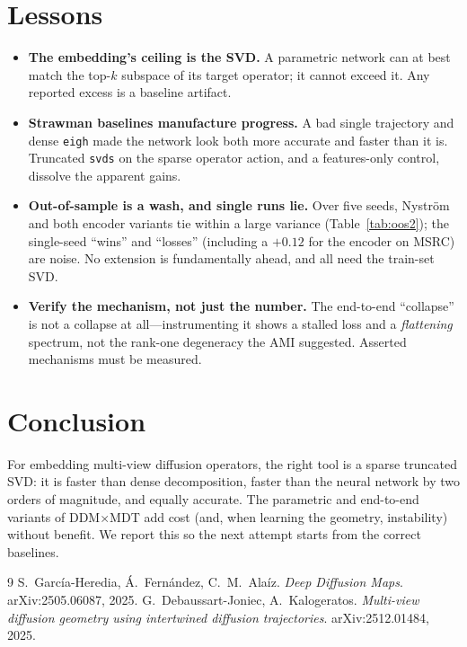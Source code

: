 \documentclass[10pt,twocolumn]{article}
\begin{document}
\section{Lessons}
\begin{itemize}\itemsep2pt
\item \textbf{The embedding's ceiling is the SVD.} A parametric network can at best match the top-$k$
subspace of its target operator; it cannot exceed it. Any reported excess is a baseline artifact.
\item \textbf{Strawman baselines manufacture progress.} A bad single trajectory and dense
\texttt{eigh} made the network look both more accurate and faster than it is. Truncated \texttt{svds}
on the sparse operator action, and a features-only control, dissolve the apparent gains.
\item \textbf{Out-of-sample is a wash, and single runs lie.} Over five seeds, Nystr\"om and both
encoder variants tie within a large variance (Table~\ref{tab:oos2}); the single-seed ``wins'' and
``losses'' (including a $+0.12$ for the encoder on MSRC) are noise. No extension is fundamentally
ahead, and all need the train-set SVD.
\item \textbf{Verify the mechanism, not just the number.} The end-to-end ``collapse'' is not a collapse
at all---instrumenting it shows a stalled loss and a \emph{flattening} spectrum, not the rank-one
degeneracy the AMI suggested. Asserted mechanisms must be measured.
\end{itemize}

\section{Conclusion}
For embedding multi-view diffusion operators, the right tool is a sparse truncated SVD: it is faster
than dense decomposition, faster than the neural network by two orders of magnitude, and equally
accurate. The parametric and end-to-end variants of DDM$\times$MDT add cost (and, when learning the
geometry, instability) without benefit. We report this so the next attempt starts from the correct
baselines.

\begin{thebibliography}{9}\footnotesize
{} S.~Garc\'ia-Heredia, \'A.~Fern\'andez, C.~M.~Ala\'iz.
\emph{Deep Diffusion Maps}. arXiv:2505.06087, 2025.
 G.~Debaussart-Joniec, A.~Kalogeratos.
\emph{Multi-view diffusion geometry using intertwined diffusion trajectories}. arXiv:2512.01484, 2025.
\end{thebibliography}
\end{document}
